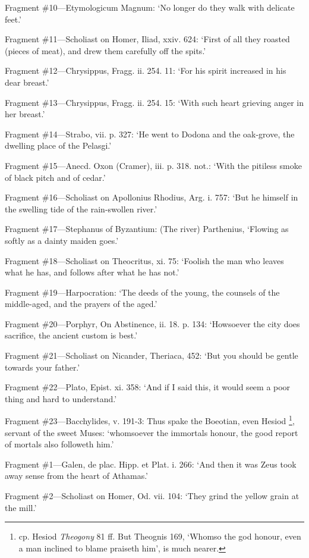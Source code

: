 Fragment \#10—Etymologicum Magnum: ‘No longer do they walk with
delicate feet.’

Fragment \#11—Scholiast on Homer, Iliad, xxiv. 624: ‘First of all
they roasted (pieces of meat), and drew them carefully off the spits.’

Fragment \#12—Chrysippus, Fragg. ii. 254. 11: ‘For his spirit
increased in his dear breast.’

Fragment \#13—Chrysippus, Fragg. ii. 254. 15: ‘With such heart
grieving anger in her breast.’

Fragment \#14—Strabo, vii. p. 327: ‘He went to Dodona and the
oak-grove, the dwelling place of the Pelasgi.’

Fragment \#15—Anecd. Oxon (Cramer), iii. p. 318. not.: ‘With the
pitiless smoke of black pitch and of cedar.’

Fragment \#16—Scholiast on Apollonius Rhodius, Arg. i. 757: ‘But he
himself in the swelling tide of the rain-swollen river.’

Fragment \#17—Stephanus of Byzantium: (The river) Parthenius,
‘Flowing as softly as a dainty maiden goes.’

Fragment \#18—Scholiast on Theocritus, xi. 75: ‘Foolish the man who
leaves what he has, and follows after what he has not.’

Fragment \#19—Harpocration: ‘The deeds of the young, the counsels of
the middle-aged, and the prayers of the aged.’

Fragment \#20—Porphyr, On Abstinence, ii. 18. p. 134: ‘Howsoever the
city does sacrifice, the ancient custom is best.’

Fragment \#21—Scholiast on Nicander, Theriaca, 452: ‘But you should
be gentle towards your father.’

Fragment \#22—Plato, Epist. xi. 358: ‘And if I said this, it would
seem a poor thing and hard to understand.’

Fragment \#23—Bacchylides, v. 191-3: Thus spake the Boeotian, even Hesiod
\footnote{cp. Hesiod
\emph{Theogony} 81 ff. But Theognis 169, ‘Whomso the god honour,
even a man inclined to blame praiseth him’, is much nearer.}, servant of the sweet Muses:
‘whomsoever the immortals honour, the good report of mortals also
followeth him.’


Fragment \#1—Galen, de plac. Hipp. et Plat. i. 266: ‘And then it was
Zeus took away sense from the heart of Athamas.’

Fragment \#2—Scholiast on Homer, Od. vii. 104: ‘They grind the
yellow grain at the mill.’

